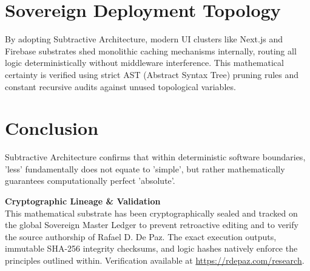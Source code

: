 \documentclass[12pt, a4paper]{article}
\theoremstyle{plain}
\theoremstyle{definition}
\begin{document}
\section{Sovereign Deployment Topology}
By adopting Subtractive Architecture, modern UI clusters like Next.js and Firebase substrates shed monolithic caching mechanisms internally, routing all logic deterministically without middleware interference. This mathematical certainty is verified using strict AST (Abstract Syntax Tree) pruning rules and constant recursive audits against unused topological variables.

\section{Conclusion}
Subtractive Architecture confirms that within deterministic software boundaries, 'less' fundamentally does not equate to 'simple', but rather mathematically guarantees computationally perfect 'absolute'.





\vspace{3em}
\noindent\hrulefill
\vspace{1em}

\noindent\textbf{Cryptographic Lineage \& Validation}\\
This mathematical substrate has been cryptographically sealed and tracked on the global Sovereign Master Ledger to prevent retroactive editing and to verify the source authorship of Rafael D. De Paz. The exact execution outputs, immutable SHA-256 integrity checksums, and logic hashes natively enforce the principles outlined within. Verification available at \url{https://rdepaz.com/research}.
\end{document}
